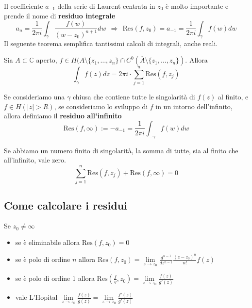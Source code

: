 \documentclass[10pt,a4paper,twoside]{book}
\begin{document}
Il coefficiente $a_{-1}$ della serie di Laurent centrata in $z_{0}$ è molto importante e prende il nome di \textbf{residuo integrale}
\begin{equation*}
a_{n} =\frac{1}{2\pi i}\int _{\gamma }\frac{f( w)}{( w-z_{0})^{n+1}} dw\ \ \Rightarrow \ \ \mathrm{Res}( f,z_{0}) =a_{-1} =\frac{1}{2\pi i}\int _{\gamma } f( w) dw
\end{equation*}
Il seguente teorema semplifica tantissimi calcoli di integrali, anche reali.
\begin{theorem}
 Sia $A\subset \mathbb{C}$ aperto, $f\in H( A\setminus \{z_{1} ,\dotsc ,z_{n}\} \cap C^{0}(\overline{A} \setminus \{z_{1} ,\dotsc ,z_{n}\})$. Allora
\begin{equation*}
\boxed{\int _{\gamma } f( z) dz=2\pi i\cdotp \sum\limits ^{n}_{j=1}\mathrm{Res}( f,z_{j})}
\end{equation*}
\end{theorem}
\begin{definition}
Se consideriamo una $\gamma $ chiusa che contiene tutte le singolarità di $f( z)$ al finito, e $f\in H(| z|  >R)$, se consideriamo lo sviluppo di $f$ in un intorno dell'infinito, allora definiamo il \textbf{residuo all'infinito}
\begin{equation*}
\mathrm{Res}( f,\infty ) :=-a_{-1} =\frac{1}{2\pi i}\int _{-\gamma } f( w) dw
\end{equation*}
\end{definition}
\begin{theorem}
Se abbiamo un numero finito di singolarità, la somma di tutte, sia al finito che all'infinito, vale zero.
\begin{equation*}
\sum\limits ^{n}_{j=1}\mathrm{Res}( f,z_{j}) +\mathrm{Res}( f,\infty ) =0
\end{equation*}
\end{theorem}
\subsection{Come calcolare i residui}

Se $z_{0} \neq \infty $
\begin{itemize}
\item se è eliminabile allora $\mathrm{Res}( f,z_{0}) =0$
\item se è polo di ordine $n$ allora $\mathrm{Res}( f,z_{0}) =\lim\limits _{z\rightarrow z_{0}}\frac{d^{n-1}}{dz^{n-1}}\frac{( z-z_{0})^{n}}{n!} f( z)$
\item se è polo di ordine $1$ allora $\mathrm{Res}\left(\frac{f}{g} ,z_{0}\right) =\lim\limits _{z\rightarrow z_{0}}\frac{f( z)}{g'( z)}$
\item vale L'Hopital $\lim\limits _{z\rightarrow z_{0}}\frac{f(z)}{g(z)} =\lim\limits _{z\rightarrow z_{0}}\frac{f'(z)}{g'(z)}$
\end{itemize}
\end{document}
